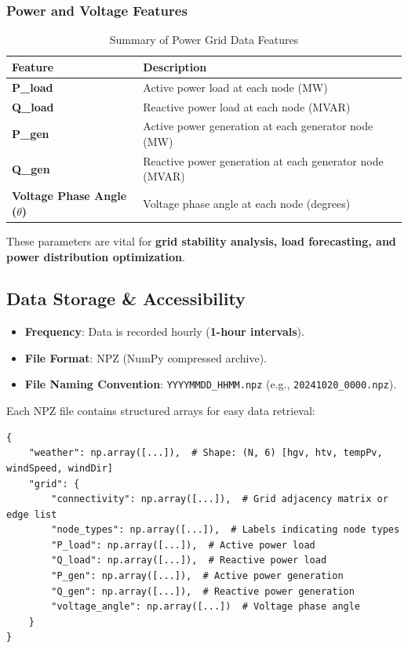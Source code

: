 \documentclass[12pt]{article}
\begin{document}
\subsubsection*{Power and Voltage Features}
\begin{table}[h]
    \centering
    \begin{tabular}{ll}
        \toprule
        \textbf{Feature} & \textbf{Description} \\
        \midrule
        \textbf{P\_load} & Active power load at each node (MW) \\
        \textbf{Q\_load} & Reactive power load at each node (MVAR) \\
        \textbf{P\_gen} & Active power generation at each generator node (MW) \\
        \textbf{Q\_gen} & Reactive power generation at each generator node (MVAR) \\
        \textbf{Voltage Phase Angle (\(\theta\))} & Voltage phase angle at each node (degrees) \\
        \bottomrule
    \end{tabular}
    \caption{Summary of Power Grid Data Features}
    \label{tab:grid}
\end{table}

These parameters are vital for \textbf{grid stability analysis, load forecasting, and power distribution optimization}.

\subsection*{Data Storage \& Accessibility}
\begin{itemize}
    \item \textbf{Frequency}: Data is recorded hourly (\textbf{1-hour intervals}).
    \item \textbf{File Format}: NPZ (NumPy compressed archive).
    \item \textbf{File Naming Convention}: \texttt{YYYYMMDD\_HHMM.npz} (e.g., \texttt{20241020\_0000.npz}).
\end{itemize}
Each NPZ file contains structured arrays for easy data retrieval:

\begin{verbatim}
{
    "weather": np.array([...]),  # Shape: (N, 6) [hgv, htv, tempPv, windSpeed, windDir]
    "grid": {
        "connectivity": np.array([...]),  # Grid adjacency matrix or edge list
        "node_types": np.array([...]),  # Labels indicating node types
        "P_load": np.array([...]),  # Active power load
        "Q_load": np.array([...]),  # Reactive power load
        "P_gen": np.array([...]),  # Active power generation
        "Q_gen": np.array([...]),  # Reactive power generation
        "voltage_angle": np.array([...])  # Voltage phase angle
    }
}
\end{verbatim}
\end{document}
